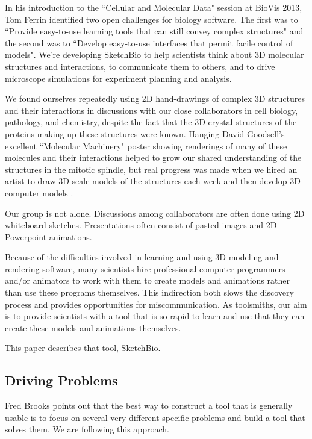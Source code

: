 \documentclass[twocolumn]{bmcart}%
\begin{document}
In his introduction to the ``Cellular and Molecular Data" session at BioVis 2013, Tom Ferrin identified two open challenges for biology software.  The first was to ``Provide easy-to-use learning tools that can still convey complex structures" and the second was to ``Develop easy-to-use interfaces that permit facile control of models".  We’re developing SketchBio to help scientists think about 3D molecular structures and interactions, to communicate them to others, and to drive microscope simulations for experiment planning and analysis.

We found ourselves repeatedly using 2D hand-drawings of complex 3D structures and their interactions in discussions with our close collaborators in cell biology, pathology, and chemistry, despite the fact that the 3D crystal structures of the proteins making up these structures were known.  Hanging David Goodsell's excellent ``Molecular Machinery" poster \cite{Goodsell} showing renderings of many of these molecules and their interactions helped to grow our shared understanding of the structures in the mitotic spindle, but real progress was made when we hired an artist to draw 3D scale models of the structures each week and then develop 3D computer models \cite{taylor2012}.

Our group is not alone.  Discussions among collaborators are often done using 2D whiteboard sketches.  Presentations often consist of pasted images and 2D Powerpoint animations.

Because of the difficulties involved in learning and using 3D modeling and rendering software, many scientists hire professional computer programmers and/or animators to work with them to create models and animations rather than use these programs themselves.  This indirection both slows the discovery process and provides opportunities for miscommunication. As toolsmiths, our aim is to provide scientists with a tool that is so rapid to learn and use that they can create these models and animations themselves.

This paper describes that tool, SketchBio.

\subsection*{Driving Problems}
Fred Brooks points out that the best way to construct a tool that is generally usable is to focus on several very different specific problems and build a tool that solves them.  We are following this approach.
\end{document}
